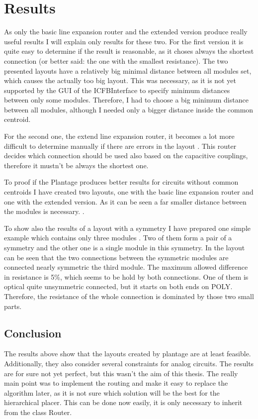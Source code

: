 \chapter{Results}
As only the basic line expansion router and the extended version produce really useful results I will explain only results for these two. For the first version  it is quite easy to determine if the result is reasonable, as it choses always the shortest connection (or better said: the one with the smallest resistance). The two presented layouts have a relatively big minimal distance between all modules set, which causes the actually too big layout. This was necessary, as it is not yet supported by the GUI of the ICFBInterface to specify minimum distances between only some modules. Therefore, I had to choose a big minimum distance between all modules, although I needed only a bigger distance inside the common centroid.

For the second one, the extend line expansion router, it becomes a lot more difficult to determine manually if there are errors in the layout . This router decides which connection should be used also based on the capacitive couplings, therefore it mustn't be always the shortest one.

To proof if the Plantage produces better results for circuits without common centroids I have created two layouts, one with the basic line expansion router and one with the extended version. As it can be seen a far smaller distance between the modules is necessary. .

To show also the results of a layout with a symmetry I have prepared one simple example which contains only three modules . Two of them form a pair of a symmetry and the other one is a single module in this symmetry. In the layout can be seen that the two connections between the symmetric modules are connected nearly symmetric the third module. The maximum allowed difference in resistance is 5\%, which seems to be hold by both connections. One of them is optical quite unsymmetric connected, but it starts on both ends on POLY. Therefore, the resistance of the whole connection is dominated by those two small parts.

\section{Conclusion}
The results above show that the layouts created by plantage are at least feasible. Additionally, they also consider several constraints for analog circuits. The results are for sure not yet perfect, but this wasn't the aim of this thesis. The really main point was to implement the routing and make it easy to replace the algorithm later, as it is not sure which solution will be the best for the hierarchical placer. This can be done now easily, it is only necessary to inherit from the class Router.

